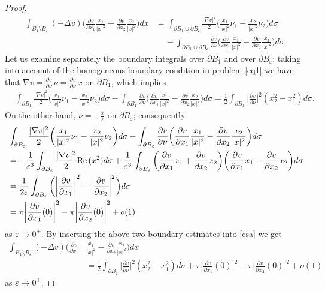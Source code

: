 \documentclass[reqno,11pt]{amsart}
\theoremstyle{definition}
\numberwithin{equation}{section}
\newcommand{\e}{\varepsilon}
\renewcommand{\(}{\left(}
\renewcommand{\)}{\right)}
\renewcommand{\[}{\left[}
\renewcommand{\]}{\right]}
\newcommand{\beq}{\begin{equation}}
\newcommand{\eeq}{\end{equation}}
\def\Re{{\rm Re}\,}
\begin{document}
{\begin{proof}
\beq\label{csa}\begin{aligned}\int_{B_1\setminus B_\e} (-\Delta v)\bigg(\frac{\partial v}{\partial x_1}\frac{x_1}{|x|^2}-\frac{\partial v}{\partial x_2}\frac{x_2}{|x|^2}\bigg)dx&=
 \int_{\partial B_1\cup\partial B_\e}\frac{ |\nabla v|^2}{2} \bigg(\frac{x_1}{|x|^2}\nu_1-\frac{x_2}{|x|^2}\nu_2\bigg) d\sigma
\\ &\;\;\;\;-\int_{\partial B_1\cup\partial B_\e }\frac{\partial v}{\partial \nu}\bigg(\frac{\partial v}{\partial x_1}\frac{x_1}{|x|^2}-\frac{\partial v}{\partial x_2}\frac{x_2}{|x|^2}\bigg)d\sigma .
\end{aligned}\eeq
Let us examine separately the boundary integrals over $\partial B_1$ and over $\partial B_\e$:
taking into account of the homogeneous boundary condition in problem \eqref{eq1} we have that $\nabla v=\frac{\partial v}{\partial \nu}\,\nu=\frac{\partial v}{\partial \nu}\,x $ on $\partial B_1$, which implies $$\begin{aligned}& \int_{\partial B_1} \frac{|\nabla v|^2 }{2}\bigg(\frac{x_1}{|x|^2}\nu_1-\frac{x_2}{|x|^2}\nu_2\bigg) d\sigma-\int_{\partial B_1}\frac{\partial v}{\partial \nu}\bigg(\frac{\partial v}{\partial x_1}\frac{x_1}{|x|^2}-\frac{\partial v}{\partial x_2}\frac{x_2}{|x|^2}\bigg)d\sigma
=\frac12\int_{\partial B_1}\bigg|\frac{\partial v}{\partial \nu}\bigg|^2 (x_2^2-x_1^2)d\sigma.
\end{aligned}$$
On the other hand,  $\nu=-\frac{x}{\e}$ on $\partial B_\e$; consequently
 $$\begin{aligned}&\int_{\partial B_\e}\frac{ |\nabla v|^2}{2} \bigg(\frac{x_1}{|x|^2}\nu_1-\frac{x_2}{|x|^2}\nu_2\bigg) d\sigma-\int_{\partial B_\e}\frac{\partial v}{\partial \nu}\bigg(\frac{\partial v}{\partial x_1}\frac{x_1}{|x|^2}-\frac{\partial v}{\partial x_2}\frac{x_2}{|x|^2}\bigg)d\sigma
 \\ &=-\frac{1}{\e^{3}} \int_{\partial B_\e} \frac{|\nabla v|^2}{2} \Re(x^2)d\sigma+\frac{1}{\e^{3}} \int_{\partial B_\e} \bigg(\frac{\partial v}{\partial x_1}x_1+\frac{\partial v}{\partial x_2}x_2\bigg)\bigg(\frac{\partial v}{\partial x_1}x_1-\frac{\partial v}{\partial x_2}x_2\bigg)d\sigma
 \\ &
=\frac{1}{2\e}\int_{\partial B_\e}\bigg(\bigg|\frac{\partial v}{\partial x_1}\bigg|^2-\bigg|\frac{\partial v}{\partial x_2}\bigg|^2\bigg)d\sigma
\\ &= \pi \bigg|\frac{\partial v}{\partial x_1}(0)\bigg|^2-\pi\bigg|\frac{\partial v}{\partial x_2}(0)\bigg|^2+o(1)  \end{aligned}$$
as $\e\to 0^+$. 
By inserting the above two boundary estimates into \eqref{csa} we get
\beq\label{csa1}\begin{aligned}\int_{B_1\setminus B_\e} (-\Delta v)\bigg(\frac{\partial v}{\partial x_1}&\frac{x_1}{|x|^2}-\frac{\partial v}{\partial x_2}\frac{x_2}{|x|^2}\bigg)dx\\&=
\frac12 \int_{\partial B_1} \bigg|\frac{\partial  v}{\partial \nu}\bigg|^2 (x_2^2-x_1^2) d\sigma 
+\pi \bigg|\frac{\partial v}{\partial x_1}(0)\bigg|^2-\pi\bigg|\frac{\partial v}{\partial x_2}(0)\bigg|^2+o(1) 
\end{aligned}\eeq as $\e\to 0^+$. 



\end{proof}}
\end{document}
